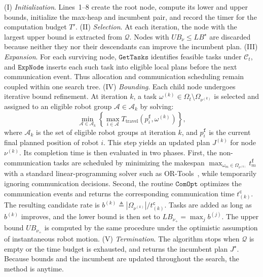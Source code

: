 (I) \emph{Initialization}.
Lines~1--8 create the root node, compute its lower and upper bounds, initialize
the max-heap and incumbent pair, and record the timer for the computation
budget $T'$.
(II) \emph{Selection}.
At each iteration, the node with the largest upper bound is extracted from
$\mathcal{Q}$. Nodes with $UB_\nu \leq LB^\star$ are discarded because neither
they nor their descendants can improve the incumbent plan.
(III) \emph{Expansion}.
For each surviving node, $\texttt{GetTasks}$ identifies feasible tasks under
$\mathcal{C}_t$, and $\texttt{ExpNode}$ inserts each such task into eligible
local plans before the next communication event. Thus allocation and
communication scheduling remain coupled within one search tree.
(IV) \emph{Bounding}.
Each child node undergoes iterative bound refinement. At iteration $k$, a task
$\omega^{(k)} \in \Omega_t \setminus \Omega_{\nu^{(k)}}$ is selected and
assigned to an eligible robot group
$\mathcal{A} \in \mathcal{A}_k$ by solving:
\begin{equation}
\min_{\mathcal{A} \in \mathcal{A}_k}
\left\{
\max_{i \in \mathcal{A}}
T_{\text{travel}}(p_i^{\texttt{f}}, \omega^{(k)})
\right\},
\label{ch05:eq:task-assign}
\end{equation}
where $\mathcal{A}_k$ is the set of eligible robot groups at iteration $k$,
and $p_i^{\texttt{f}}$ is the current final planned position of robot $i$.
This step yields an updated plan $J^{(k)}$ for node $\nu^{(k)}$. Its
completion time is then evaluated in two phases. First, the non-communication
tasks are scheduled by minimizing the makespan
$\max_{\omega_m \in \Omega_{\nu^{(k)}}} t_m^{\texttt{f}}$ with a standard
linear-programming solver such as OR-Tools~\citep{glop}, while temporarily
ignoring communication decisions. Second, the routine $\texttt{ComOpt}$
optimizes the communication events and returns the corresponding communication
time $t_{(k)}^{\texttt{c}}$. The resulting candidate rate is
$b^{(k)} \triangleq |\Omega_{\nu^{(k)}}| / t_{(k)}^{\texttt{c}}$. Tasks are
added as long as $b^{(k)}$ improves, and the lower bound is then set to
$LB_{\nu_+} = \max_j b^{(j)}$. The upper bound $UB_{\nu_+}$ is computed by the
same procedure under the optimistic assumption of instantaneous robot motion.
(V) \emph{Termination}.
The algorithm stops when $\mathcal{Q}$ is empty or the time budget is exhausted,
and returns the incumbent plan $J^\star$. Because bounds and the incumbent are
updated throughout the search, the method is anytime.

